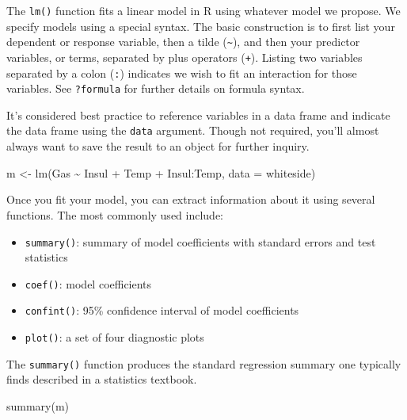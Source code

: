 \documentclass[
]{book}
\newenvironment{Shaded}{\begin{snugshade}}{\end{snugshade}}
\newcommand{\AttributeTok}[1]{\textcolor[rgb]{0.77,0.63,0.00}{#1}}
\newcommand{\FunctionTok}[1]{\textcolor[rgb]{0.00,0.00,0.00}{#1}}
\newcommand{\NormalTok}[1]{#1}
\newcommand{\OtherTok}[1]{\textcolor[rgb]{0.56,0.35,0.01}{#1}}
\newcommand{\SpecialCharTok}[1]{\textcolor[rgb]{0.00,0.00,0.00}{#1}}
\providecommand{\tightlist}{%
  \setlength{\itemsep}{0pt}\setlength{\parskip}{0pt}}
\begin{document}
The \texttt{lm()} function fits a linear model in R using whatever model we propose. We specify models using a special syntax. The basic construction is to first list your dependent or response variable, then a tilde (\texttt{\textasciitilde{}}), and then your predictor variables, or terms, separated by plus operators (\texttt{+}). Listing two variables separated by a colon (\texttt{:}) indicates we wish to fit an interaction for those variables. See \texttt{?formula} for further details on formula syntax.

It's considered best practice to reference variables in a data frame and indicate the data frame using the \texttt{data} argument. Though not required, you'll almost always want to save the result to an object for further inquiry.

\begin{Shaded}
\begin{Highlighting}[]
\NormalTok{m }\OtherTok{\textless{}{-}} \FunctionTok{lm}\NormalTok{(Gas }\SpecialCharTok{\textasciitilde{}}\NormalTok{ Insul }\SpecialCharTok{+}\NormalTok{ Temp }\SpecialCharTok{+}\NormalTok{ Insul}\SpecialCharTok{:}\NormalTok{Temp, }\AttributeTok{data =}\NormalTok{ whiteside)}
\end{Highlighting}
\end{Shaded}

Once you fit your model, you can extract information about it using several functions. The most commonly used include:

\begin{itemize}
\tightlist
\item
  \texttt{summary()}: summary of model coefficients with standard errors and test statistics
\item
  \texttt{coef()}: model coefficients
\item
  \texttt{confint()}: 95\% confidence interval of model coefficients
\item
  \texttt{plot()}: a set of four diagnostic plots
\end{itemize}

The \texttt{summary()} function produces the standard regression summary one typically finds described in a statistics textbook.

\begin{Shaded}
\begin{Highlighting}[]
\FunctionTok{summary}\NormalTok{(m)}
\end{Highlighting}
\end{Shaded}
\end{document}
